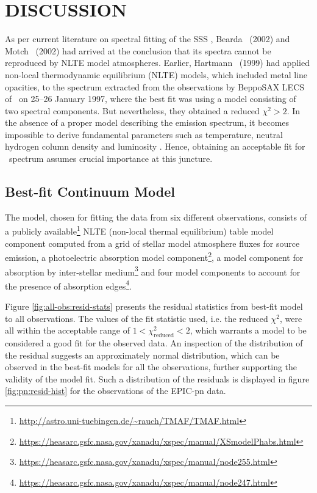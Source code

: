     \section{\MakeUppercase{Discussion}} \label{multi-obs:discussion}
    	As per current literature on spectral fitting of the SSS \source, Bearda \etal\ (2002) \cite{beardaChandra2002AA} and Motch \etal\ (2002) \cite{motchXmmNewton2002AA} had arrived at the conclusion that its spectra cannot be reproduced by NLTE model atmospheres. Earlier, Hartmann \etal\ (1999) \cite{hartmann1999constraining} had applied non-local thermodynamic equilibrium (NLTE) models, which included metal line opacities, to the spectrum extracted from the observations by BeppoSAX LECS of \source\ on 25--26 January 1997, where the best fit was using a model consisting of two spectral components. But nevertheless, they obtained a reduced $\chi^2>2$. In the absence of a proper model describing the emission spectrum, it becomes impossible to
derive fundamental parameters such as temperature, neutral hydrogen column density and luminosity \cite{motchXmmNewton2002AA}. Hence, obtaining an acceptable fit for \source\ spectrum assumes crucial importance at this juncture.
    
    	\subsection{Best-fit Continuum Model} \label{multi-obs:discussion:cont-mod}
    		The model, chosen for fitting the data from six different observations, consists of a publicly available\footnote{\url{http://astro.uni-tuebingen.de/~rauch/TMAF/TMAF.html}} NLTE (non-local thermal equilibrium) table model component computed from a grid of stellar model atmosphere fluxes for source emission, a photoelectric absorption model component\footnote{\url{https://heasarc.gsfc.nasa.gov/xanadu/xspec/manual/XSmodelPhabs.html}}, a model component for absorption by inter-stellar medium\footnote{\url{https://heasarc.gsfc.nasa.gov/xanadu/xspec/manual/node255.html}} and four model components to account for the presence of absorption edges\footnote{\url{https://heasarc.gsfc.nasa.gov/xanadu/xspec/manual/node247.html}}.
    		
    		Figure \ref{fig:all-obs:resid-stats} presents the residual statistics from best-fit model to all observations. The values of the fit statistic used, i.e. the reduced $\chi^2$, were all within the acceptable range of $1<\chi^2_\text{reduced}<2$, which warrants a model to be considered a good fit for the observed data. An inspection of the distribution of the residual suggests an approximately normal distribution, which can be observed in the best-fit models for all the observations, further supporting the validity of the model fit. Such a distribution of the residuals is displayed in figure \ref{fig:pn:resid-hist} for the observations of the EPIC-pn data.
    		
